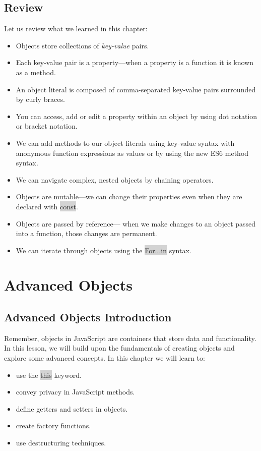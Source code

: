 \documentclass[11pt]{article}
\begin{document}
\subsection{Review}
Let us review what we learned in this chapter:
\begin{itemize}[leftmargin = *]
\item Objects store collections of \textit{key-value} pairs.
\item Each key-value pair is a property—when a property is a function it is known as a method.
\item An object literal is composed of comma-separated key-value pairs surrounded by curly braces.
\item You can access, add or edit a property within an object by using dot notation or bracket notation.
\item We can add methods to our object literals using key-value syntax with anonymous function expressions as values or by using the new ES6 method syntax.
\item We can navigate complex, nested objects by chaining operators.
\item Objects are mutable—we can change their properties even when they are declared with \colorbox{lightgray}{const}.
\item Objects are passed by reference— when we make changes to an object passed into a function, those changes are permanent.
\item We can iterate through objects using the \colorbox{lightgray}{For...in} syntax.
\end{itemize}

\newpage
\section{Advanced Objects}
\subsection{Advanced Objects Introduction}
Remember, objects in JavaScript are containers that store data and functionality. In this lesson, we will build upon the fundamentals of creating objects and explore some advanced concepts.
In this chapter we will learn to:
\begin{itemize}[leftmargin = *]
\item use the \colorbox{lightgray}{this} keyword.
\item convey privacy in JavaScript methods.
\item define getters and setters in objects.
\item create factory functions.
\item use destructuring techniques.
\end{itemize}
\end{document}
